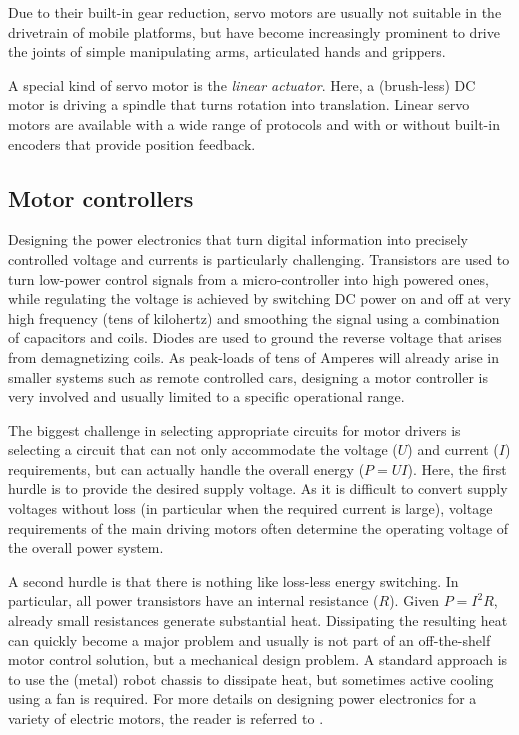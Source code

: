 Due to their built-in gear reduction, servo motors are usually not suitable in the drivetrain of mobile platforms, but have become increasingly prominent to drive the joints of simple manipulating arms, articulated hands and grippers.

A special kind of servo motor is the \textsl{linear actuator}. Here, a (brush-less) DC motor is driving a spindle that turns rotation into translation. Linear servo motors are available with a wide range of protocols and with or without built-in encoders that provide position feedback.

\subsection{Motor controllers}

Designing the power electronics that turn digital information into precisely controlled voltage and currents is particularly challenging. Transistors are used to turn low-power control signals from a micro-controller into high powered ones, while regulating the voltage is achieved by switching DC power on and off at very high frequency (tens of kilohertz) and smoothing the signal using a combination of capacitors and coils. Diodes are used to ground the reverse voltage that arises from demagnetizing coils. As peak-loads of tens of Amperes will already arise in smaller systems such as remote controlled cars, designing a motor controller is very involved and usually limited to a specific operational range.

The biggest challenge in selecting appropriate circuits for motor drivers is selecting a circuit that can not only accommodate the voltage ($U$) and current ($I$) requirements, but can actually handle the overall energy ($P=UI$). Here, the first hurdle is to provide the desired supply voltage. As it is difficult to convert supply voltages without loss (in particular when the required current is large), voltage requirements of the main driving motors often determine the operating voltage of the overall power system.

A second hurdle is that there is nothing like loss-less energy switching. In particular, all power transistors have an internal resistance ($R$). Given $P=I^2R$, already small resistances generate substantial heat. Dissipating the resulting heat can quickly become a major problem and usually is not part of an off-the-shelf motor control solution, but a mechanical design problem. A standard approach is to use the (metal) robot chassis to dissipate heat, but sometimes active cooling using a fan is required. For more details on designing power electronics for a variety of electric motors, the reader is referred to \cite{hughes2019electric}.


